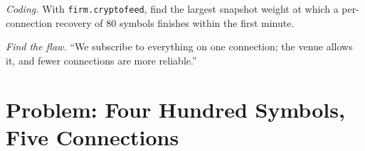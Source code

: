 \begin{exercise}[$\star\star\star$]\label{exo:nw:api-engineering-for-crypto-venues:7}
\emph{Coding.} With \texttt{firm.cryptofeed}, find the largest snapshot weight at which a per-connection recovery of 80 symbols finishes within the
first minute.
\end{exercise}

\begin{exercise}[$\star\star\star$]\label{exo:nw:api-engineering-for-crypto-venues:8}
\emph{Find the flaw.} ``We subscribe to everything on one connection; the venue allows it, and fewer connections are more reliable.''
\end{exercise}

\section{Problem: Four Hundred Symbols, Five Connections}

